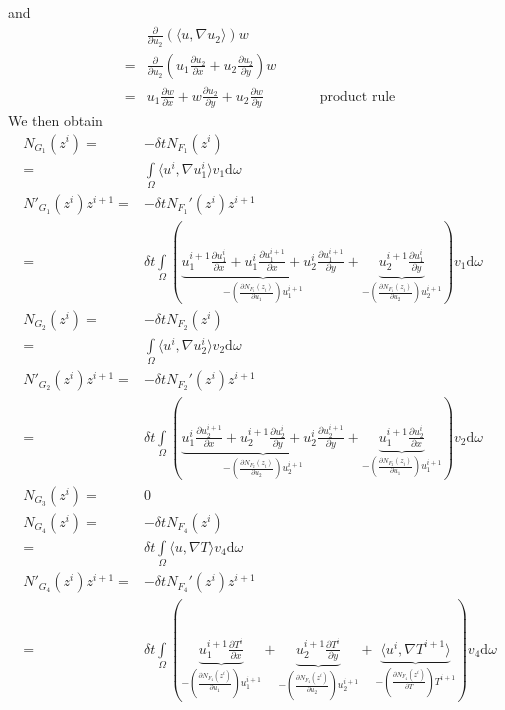 \documentclass{article}
\begin{document}
and 
\begin{align*}
&\frac{\partial}{\partial u_2}(\langle u,\nabla u_2\rangle) w  \\
=& \frac{\partial}{\partial u_2}(u_1 \frac{\partial u_2}{\partial x} + u_2 \frac{\partial u_2}{\partial y}) w\\
=& u_1\frac{\partial w}{\partial x}+ w\frac{\partial u_2}{\partial y}+ u_2 \frac{\partial w}{\partial y}\qquad \qquad \text{product rule}
\end{align*}
We then obtain
\begin{align*}
N_{G_1}(z^i) = &-\delta t N_{F_1}(z^i)\\
= &\int\limits_\Omega \langle u^i ,\nabla u_1^i \rangle v_1 \text{d}\omega\\
N'_{G_1}(z^i)z^{i+1} = &-\delta t N_{F_1}'(z^i)z^{i+1}\\
= &\delta t\int\limits_\Omega ( \underbrace{u_1^{i+1}\frac{\partial u_1^i}{\partial x} + u_1^i\frac{\partial u_1^{i+1}}{\partial x} + u_2^{i}\frac{\partial u_1^{i+1}}{\partial y}}_{-(\frac{\partial N_{F_1}(z_i)}{\partial u_1})u_1^{i+1}} 
+ \underbrace{ u_2^{i+1} \frac{\partial u_1^i}{\partial y}}_{-(\frac{\partial N_{F_1}(z_i)}{\partial u_2})u_2^{i+1}} ) v_1\text{d}\omega \\
N_{G_2}(z^i) = &-\delta t N_{F_2}(z^i)\\
= &\int\limits_\Omega \langle u^i ,\nabla u_2^i \rangle v_2 \text{d}\omega\\
N'_{G_2}(z^i)z^{i+1} = &-\delta t N_{F_2}'(z^i)z^{i+1}\\
= & \delta t\int\limits_\Omega ( \underbrace{u_1^{i}\frac{\partial u_2^{i+1}}{\partial x} + u_2^{i+1}\frac{\partial u_2^{i}}{\partial y} + u_2^{i}\frac{\partial u_2^{i+1}}{\partial y}}_{-(\frac{\partial N_{F_2}(z_i)}{\partial u_2})u_2^{i+1}} 
+ \underbrace{ u_1^{i+1} \frac{\partial u_2^i}{\partial x}}_{-(\frac{\partial N_{F_2}(z_i)}{\partial u_1})u_1^{i+1}} ) v_2\text{d}\omega \\
N_{G_3}(z^i) =& 0 \\
N_{G_4}(z^i) =& -\delta t N_{F_4}(z^i)\\
=& \delta t\int\limits_\Omega \langle u,\nabla T\rangle v_4 \text{d}\omega \\
N'_{G_4}(z^i)z^{i+1} = &-\delta t N_{F_4}'(z^i)z^{i+1}\\
=& \delta t \int\limits_\Omega  (\underbrace{u_1^{i+1}\frac{\partial T^{i}}{\partial x}}_{-(\frac{\partial N_{F_4}(z^i)}{\partial u_1})u_1^{i+1}}+ \underbrace{u_2^{i+1}\frac{\partial T^{i}}{\partial y}}_{-(\frac{\partial N_{F_4}(z^i)}{\partial u_2})u_2^{i+1} }+\underbrace{\langle u^i,\nabla T^{i+1}\rangle }_{-(\frac{\partial N_{F_4}(z^i)}{\partial T})T^{i+1}})v_4 \text{d}\omega
\end{align*}
\end{document}
